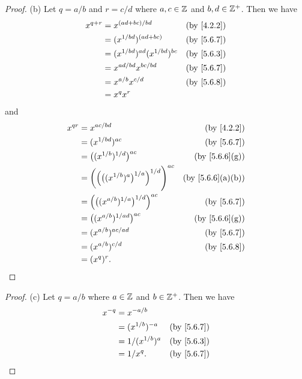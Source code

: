 \begin{proof}{(b)}
  Let \(q = a / b\) and \(r = c / d\) where \(a, c \in \mathbb{Z}\) and \(b, d \in \mathbb{Z}^+\).
  Then we have
  \begin{align*}
    x^{q + r} & = x^{(ad + bc) / bd}                  & \text{(by \cref{4.2.2})}  \\
              & = (x^{1 / bd})^{(ad + bc)}            & \text{(by \cref{5.6.7})}  \\
              & = (x^{1 / bd})^{ad} (x^{1 / bd})^{bc} & \text{(by \cref{5.6.3})}  \\
              & = x^{ad / bd} x^{bc / bd}             & \text{(by  \cref{5.6.7})} \\
              & = x^{a / b} x^{c / d}                 & \text{(by \cref{5.6.8})}  \\
              & = x^q x^r
  \end{align*}
  and
  \begin{align*}
    x^{qr} & = x^{ac / bd}                                                        & \text{(by \cref{4.2.2})}       \\
           & = (x^{1 / bd})^{ac}                                                  & \text{(by \cref{5.6.7})}       \\
           & = \big((x^{1 / b})^{1 / d}\big)^{ac}                                 & \text{(by \cref{5.6.6}(g))}    \\
           & = \bigg(\Big(\big((x^{1 / b})^a\big)^{1 / a}\Big)^{1 / d}\Bigg)^{ac} & \text{(by \cref{5.6.6}(a)(b))} \\
           & = \Big(\big((x^{a / b})^{1 / a}\big)^{1 / d}\Big)^{ac}               & \text{(by \cref{5.6.7})}       \\
           & = \big((x^{a / b})^{1 / ad}\big)^{ac}                                & \text{(by \cref{5.6.6}(g))}    \\
           & = (x^{a / b})^{ac / ad}                                              & \text{(by \cref{5.6.7})}       \\
           & = (x^{a / b})^{c / d}                                                & \text{(by \cref{5.6.8})}       \\
           & = (x^q)^r.
  \end{align*}
\end{proof}

\begin{proof}{(c)}
  Let \(q = a / b\) where \(a \in \mathbb{Z}\) and \(b \in \mathbb{Z}^+\).
  Then we have
  \begin{align*}
    x^{-q} & = x^{-a / b}                                   \\
           & = (x^{1 / b})^{-a}  & \text{(by \cref{5.6.7})} \\
           & = 1 / (x^{1 / b})^a & \text{(by \cref{5.6.3})} \\
           & = 1 / x^q.          & \text{(by \cref{5.6.7})}
  \end{align*}
\end{proof}

